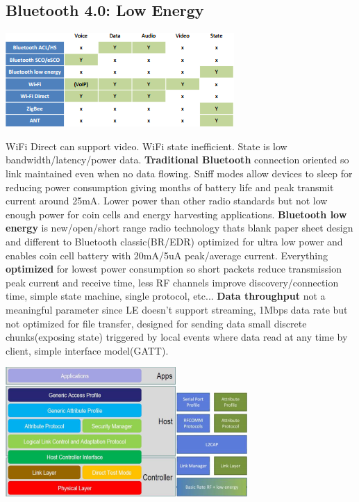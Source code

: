 \documentclass[9pt]{extarticle}
\begin{document}
\begin{multicols}{2}
\section{Bluetooth 4.0: Low Energy}

\includegraphics{srwaa.png}

WiFi Direct can support video. WiFi state inefficient. State is low bandwidth/latency/power data.\textbf{ Traditional Bluetooth} connection oriented so link maintained even when no data flowing. Sniff modes allow devices to sleep for reducing power consumption giving months of battery life and peak transmit current around 25mA. Lower power than other radio standards but not low enough power for coin cells and energy harvesting applications.\textbf{ Bluetooth low energy} is new/open/short range radio technology thats blank paper sheet design and different to Bluetooth classic(BR/EDR) optimized for ultra low power and enables coin cell battery with 20mA/5uA peak/average current. Everything \textbf{optimized} for lowest power consumption so short packets reduce transmission peak current and receive time, less RF channels improve discovery/connection time, simple state machine, single protocol, etc...\textbf{ Data throughput }not a meaningful parameter since LE doesn't support streaming, 1Mbps data rate but not optimized for file transfer, designed for sending data small discrete chunks(exposing state) triggered by local events where data read at any time by client, simple interface model(GATT). 

\includegraphics{blearchitecture.png}\includegraphics{dualmodestack.png}


\end{multicols}
\end{document}
